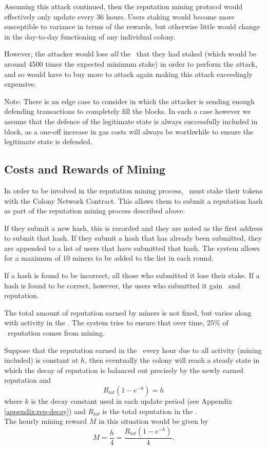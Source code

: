 Assuming this attack continued, then the reputation mining protocol would effectively only update every 36 hours. Users staking would become more susceptible to variance in terms of the rewards, but otherwise little would change in the day-to-day functioning of any individual colony. 

However, the attacker would lose \emph{all} the \rct\ that they had staked (which would be around 4500 times the expected minimum stake) in order to perform the attack, and so would have to buy more to attack again making this attack exceedingly expensive.


Note: There is an edge case to consider in which the attacker is sending enough defending transactions to completely fill the blocks. In such a case however we assume that the defence of the legitimate state is always successfully included in block, as a one-off increase in gas costs will always be worthwhile to ensure the legitimate state is defended.  

\subsection{Costs and Rewards of Mining}\label{subsec:mining-costs-and-rewards}
In order to be involved in the reputation mining process, \rcths\ must stake their tokens with the Colony Network Contract. This allows them to submit a reputation hash as part of the reputation mining process described above.

If they submit a new hash, this is recorded and they are noted as the first address to submit that hash. If they submit a hash that has already been submitted, they are appended to a list of users that have submitted that hash. The system allows for a maximum of 10 miners to be added to the list in each round.

If a hash is found to be incorrect, all those who submitted it lose their stake. If a hash is found to be correct, however, the users who submitted it gain \rcts\ and reputation. 

The total amount of reputation earned by miners is not fixed, but varies along with activity in the \rc. The system tries to ensure that over time, 25\% of \rc\ reputation comes from mining. %

Suppose that the reputation earned in the \rc\ every hour due to all activity (mining included) is constant at $h$, then eventually the colony will reach a steady state in which the decay of reputation is balanced out precisely by the newly earned reputation and
\begin{equation}
 R_{tot} \left( 1 - e^{-k} \right) = h
\end{equation}
\noindent where $k$ is the decay constant used in each update period (see Appendix \ref{appendix:rep-decay}) and $R_{tot}$ is the total reputation in the \rc.\\
The hourly mining reward $M$ in this situation would be given by
\begin{equation}\label{eq:mining-reward}
 M = \frac{h}{4} = \frac{R_{tot} \left( 1 - e^{-k} \right)}{4}.
\end{equation}

